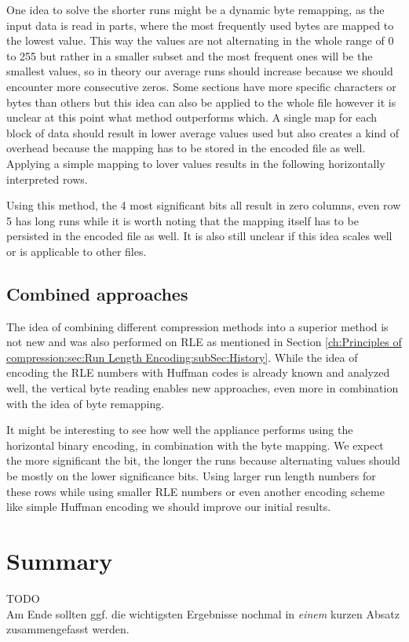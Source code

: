 \par{
One idea to solve the shorter runs might be a dynamic byte remapping, as the input data is read in parts, where the most frequently used bytes are mapped to the lowest value. This way the values are not alternating in the whole range of 0 to 255 but rather in a smaller subset and the most frequent ones will be the smallest values, so in theory our average runs should increase because we should encounter more consecutive zeros. Some sections have more specific characters or bytes than others but this idea can also be applied to the whole file however it is unclear at this point what method outperforms which. A single map for each block of data should result in lower average values used but also creates a kind of overhead because the mapping has to be stored in the encoded file as well. Applying a simple mapping to lover values results in the following horizontally interpreted rows.
}

\par{
\arraydump\dataC

Using this method, the 4 most significant bits all result in zero columns, even row 5 has long runs while it is worth noting that the mapping itself has to be persisted in the encoded file as well. It is also still unclear if this idea scales well or is applicable to other files.
}

\subsection{Combined approaches}
\par{
The idea of combining different compression methods into a superior method is not new and was also performed on RLE as mentioned in Section \ref{ch:Principles of compression:sec:Run Length Encoding:subSec:History}. While the idea of encoding the RLE numbers with Huffman codes is already known and analyzed well, the vertical byte reading enables new approaches, even more in combination with the idea of byte remapping.
}

\par{
It might be interesting to see how well the appliance performs using the horizontal binary encoding, in combination with the byte mapping. We expect the more significant the bit, the longer the runs because alternating values should be mostly on the lower significance bits. Using larger run length numbers for these rows while using smaller RLE numbers or even another encoding scheme like simple Huffman encoding we should improve our initial results.
}

\section{Summary}
\label{ch:Analyse:sec:Summary}

TODO\\

Am Ende sollten ggf. die wichtigsten Ergebnisse nochmal in \emph{einem}
kurzen Absatz zusammengefasst werden.


